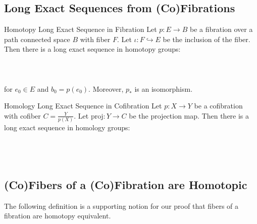 \documentclass[a4paper]{article}
\begin{document}
\subsection{Long Exact Sequences from (Co)Fibrations}
\begin{thm}{Homotopy Long Exact Sequence in Fibration}{} Let $p:E\to B$ be a fibration over a path connected space $B$ with fiber $F$. Let $\iota:F\hookrightarrow E$ be the inclusion of the fiber. Then there is a long exact sequence in homotopy groups: \\~\\
\\~\\
for $e_0\in E$ and $b_0=p(e_0)$. Moreover, $p_\ast$ is an isomorphism. 
\end{thm}

\begin{thm}{Homology Long Exact Sequence in Cofibration}{} Let $p:X\to Y$ be a cofibration with cofiber $C=\frac{Y}{p(X)}$. Let $\text{proj}:Y\to C$ be the projection map. Then there is a long exact sequence in homology groups: \\~\\
\\~\\
\end{thm}

\subsection{(Co)Fibers of a (Co)Fibration are Homotopic}
The following definition is a supporting notion for our proof that fibers of a fibration are homotopy equivalent. 
\end{document}

